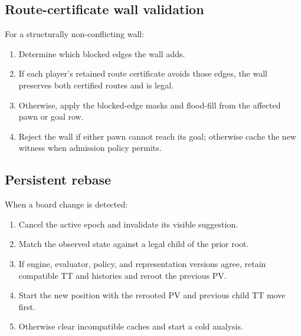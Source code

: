 \subsection{Route-certificate wall validation}
For a structurally non-conflicting wall:
\begin{enumerate}
\item Determine which blocked edges the wall adds.
\item If each player's retained route certificate avoids those edges, the wall preserves both certified routes and is legal.
\item Otherwise, apply the blocked-edge masks and flood-fill from the affected pawn or goal row.
\item Reject the wall if either pawn cannot reach its goal; otherwise cache the new witness when admission policy permits.
\end{enumerate}

\subsection{Persistent rebase}
When a board change is detected:
\begin{enumerate}
\item Cancel the active epoch and invalidate its visible suggestion.
\item Match the observed state against a legal child of the prior root.
\item If engine, evaluator, policy, and representation versions agree, retain compatible TT and histories and reroot the previous PV.
\item Start the new position with the rerooted PV and previous child TT move first.
\item Otherwise clear incompatible caches and start a cold analysis.
\end{enumerate}

